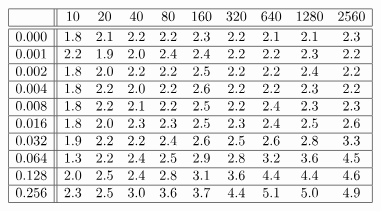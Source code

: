 \[
\begin{array}{|c||ccccccccc|}
\hline 
& 10 & 20 & 40 & 80 & 160 & 320 & 640 & 1280 & 2560\\
\hline \hline 
0.000 & 1.8 & 2.1 & 2.2 & 2.2 & 2.3 & 2.2 & 2.1 & 2.1 & 2.3 \\ \hline 
0.001 & 2.2 & 1.9 & 2.0 & 2.4 & 2.4 & 2.2 & 2.2 & 2.3 & 2.2 \\ \hline 
0.002 & 1.8 & 2.0 & 2.2 & 2.2 & 2.5 & 2.2 & 2.2 & 2.4 & 2.2 \\ \hline 
0.004 & 1.8 & 2.2 & 2.0 & 2.2 & 2.6 & 2.2 & 2.2 & 2.3 & 2.2 \\ \hline 
0.008 & 1.8 & 2.2 & 2.1 & 2.2 & 2.5 & 2.2 & 2.4 & 2.3 & 2.3 \\ \hline 
0.016 & 1.8 & 2.0 & 2.3 & 2.3 & 2.5 & 2.3 & 2.4 & 2.5 & 2.6 \\ \hline 
0.032 & 1.9 & 2.2 & 2.2 & 2.4 & 2.6 & 2.5 & 2.6 & 2.8 & 3.3 \\ \hline 
0.064 & 1.3 & 2.2 & 2.4 & 2.5 & 2.9 & 2.8 & 3.2 & 3.6 & 4.5 \\ \hline 
0.128 & 2.0 & 2.5 & 2.4 & 2.8 & 3.1 & 3.6 & 4.4 & 4.4 & 4.6 \\ \hline 
0.256 & 2.3 & 2.5 & 3.0 & 3.6 & 3.7 & 4.4 & 5.1 & 5.0 & 4.9 \\ \hline 
\end{array}
\]

